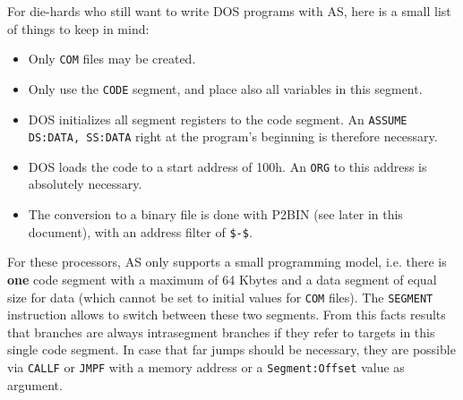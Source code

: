\documentclass[12pt,twoside]{report}
\newcommand{\bb}[1]{{\bf #1}}
\newcommand{\tty}[1]{{\tt #1}}
\newcommand{\asname}{{AS}}
\begin{document}
For die-hards who still want to write DOS programs with \asname{}, here is a
small list of things to keep in mind:
\begin{itemize}
\item{Only \tty{COM} files may be created.}
\item{Only use the \tty{CODE} segment, and place also all variables in
      this segment.}
\item{DOS initializes all segment registers to the code segment.
      An \tty{ASSUME DS:DATA, SS:DATA} right at the program's beginning
      is therefore necessary.}
\item{DOS loads the code to a start address of 100h.  An \tty{ORG} to this
      address is absolutely necessary.}
\item{The conversion to a binary file is done with P2BIN (see later in
      this document), with an address filter of \tty{\$-\$}.}
\end{itemize}
For these processors, \asname{} only supports a small programming model, i.e.
there is \bb{one} code segment with a maximum of 64 Kbytes and a data
segment of equal size for data (which cannot be set to initial values for
\tty{COM} files).  The \tty{SEGMENT} instruction allows to switch between
these two segments.  From this facts results that branches are always
intrasegment branches if they refer to targets in this single code
segment.  In case that far jumps should be necessary, they are possible
via \tty{CALLF} or \tty{JMPF} with a memory address or a
\tty{Segment:Offset} value as argument.
\end{document}
